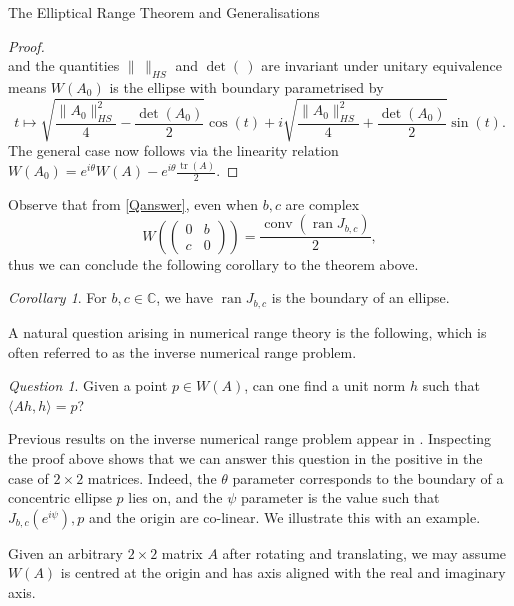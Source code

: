 \documentclass[12pt]{article}
\theoremstyle{plain}
\theoremstyle{definition}
\theoremstyle{remark}
\newcommand{\ran}{\operatorname{ran}}
\newcommand{\tr}{\operatorname{tr}}
\newtheorem{Corollary}[Theorem]{Corollary}
\newtheorem{Question}[Theorem]{Question}
\numberwithin{equation}{section}
\begin{document}
\begin{section}{The Elliptical Range Theorem and Generalisations}
\begin{proof}
\begin{equation}
\end{equation} and the quantities $\| \, \|_{HS}$ and $\det( \, )$ are invariant under unitary equivalence means $W(A_0)$ is the ellipse with boundary parametrised by
$$
t \mapsto \sqrt{\frac{\|A_0\|_{HS}^2}{4} - \frac{\det(A_0)}{2}} \cos(t) + i \sqrt{\frac{\|A_0\|_{HS}^2}{4} + \frac{\det(A_0)}{2}} \sin(t).
$$
The general case now follows via the linearity relation $W(A_0) = e^{i \theta}W(A) - e^{i \theta}\frac{\tr(A)}{2}$.
\end{proof}
Observe that from \eqref{Qanswer}, even when $b,c$ are complex 
$$
W \left( \begin{pmatrix}
    0 & b \\
     c & 0 
\end{pmatrix} \right) = \frac{\operatorname{conv}(\ran J_{b,c})}{2},
$$
thus we can conclude the following corollary to the theorem above.

\begin{Corollary}
    For $b,c \in \mathbb{C}$, we have $\ran J_{b,c}$ is the boundary of an ellipse.
\end{Corollary}


A natural question arising in numerical range theory is the following, which is often referred to as the inverse numerical range problem. 
\begin{Question}
    Given a point $p \in W(A)$, can one find a unit norm $h$ such that $\langle Ah,h \rangle  = p$?
\end{Question}

Previous results on the inverse numerical range problem appear in \cite{inverseproblem1, inverseproblem2, inverseproblem3}. Inspecting the proof above shows that we can  answer this question in the positive in the case of $2 \times 2$ matrices. Indeed, the $\theta$ parameter corresponds to the boundary of a concentric ellipse $p$ lies on, and the $\psi$ parameter is the value such that $J_{b,c}(e^{i \psi}), p $ and the origin are co-linear. We illustrate this with an example.


Given an arbitrary $2 \times 2 $ matrix $A$ after rotating and translating, we may assume $W(A)$ is centred at the origin and has axis aligned with the real and imaginary axis.




\end{section}
\end{document}
